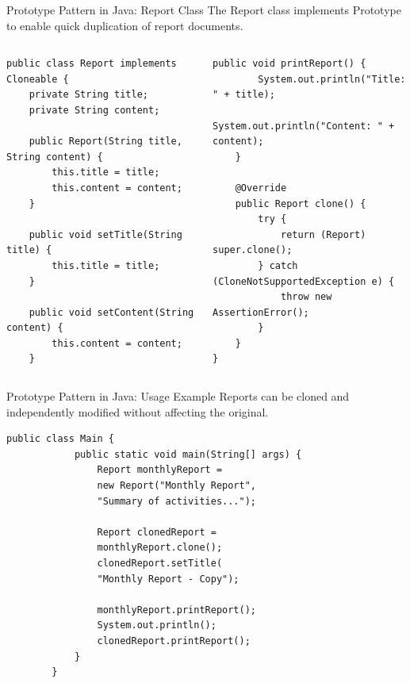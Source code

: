 \documentclass[aspectratio=169, table]{beamer}
\begin{document}
\begin{frame}[fragile]{Prototype Pattern in Java: Report Class}
\vspace{20pt}
The Report class implements Prototype to enable quick duplication of report documents.

\begin{columns}[T]
\begin{lstlisting}[style=JavaStyle, firstnumber=1, basicstyle=\ttfamily\tiny]
public class Report implements Cloneable {
	private String title;
	private String content;
	
	public Report(String title, String content) {
		this.title = title;
		this.content = content;
	}
	
	public void setTitle(String title) {
		this.title = title;
	}
	
	public void setContent(String content) {
		this.content = content;
	}
\end{lstlisting}

\begin{lstlisting}[style=JavaStyle, firstnumber=17, basicstyle=\ttfamily\tiny]
	public void printReport() {
		System.out.println("Title: " + title);
		System.out.println("Content: " + content);
	}
	
	@Override
	public Report clone() {
		try {
			return (Report) super.clone();
		} catch (CloneNotSupportedException e) {
			throw new AssertionError();
		}
	}
}
\end{lstlisting}
\end{columns}
\end{frame}


\begin{frame}[fragile]{Prototype Pattern in Java: Usage Example}
	\vspace{20pt}
	Reports can be cloned and independently modified without affecting the original.
	
	\vspace{10pt}
	\begin{lstlisting}[style=JavaStyle]
		public class Main {
			public static void main(String[] args) {
				Report monthlyReport = 
				new Report("Monthly Report", 
				"Summary of activities...");
				
				Report clonedReport = 
				monthlyReport.clone();
				clonedReport.setTitle(
				"Monthly Report - Copy");
				
				monthlyReport.printReport();
				System.out.println();
				clonedReport.printReport();
			}
		}
	\end{lstlisting}
\end{frame}
\end{document}
